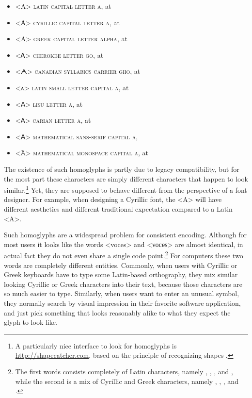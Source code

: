 \begin{itemize}
	\item[] <{A}> \textsc{latin capital letter a}, at  
	\item[] <{А}> \textsc{cyrillic capital letter a}, at  
	\item[] <{Α}> \textsc{greek capital letter alpha}, at  
	\item[] <{Ꭺ}> \textsc{cherokee letter go}, at  
	\item[] <{ᗅ}> \textsc{canadian syllabics carrier gho}, at  
	\item[] <{ᴀ}> \textsc{latin small letter capital a}, at  
	\item[] <{ꓮ}> \textsc{lisu letter a}, at  
	\item[] <{𐊠}> \textsc{carian letter a}, at  
	\item[] <{𝖠}> \textsc{mathematical sans-serif capital a},  
	\item[] <{𝙰}> \textsc{mathematical monospace capital a}, at  
\end{itemize}

The existence of such homoglyphs is partly due to legacy compatibility, but for
the most part these characters are simply different characters that happen to
look similar.\footnote{A particularly nice interface to look for homoglyphs is
\url{http://shapecatcher.com}, based on the principle of recognizing shapes
\citep{Belongie2002}.} Yet, they are supposed to behave different from the
perspective of a font designer. For example, when designing a Cyrillic font, the
<A> will have different aesthetics and different traditional expectation
compared to a Latin <A>.

Such homoglyphs are a widespread problem for consistent encoding. Although for
most users it looks like the words <voces> and <νοсеѕ> are almost identical, in
actual fact they do not even share a single code point.\footnote{The first words
consists completely of Latin characters, namely , ,
,  and , while the second is a mix of Cyrillic
and Greek characters, namely , , , 
and .} For computers these two words are completely different
entities. Commonly, when users with Cyrillic or Greek keyboards have to type
some Latin-based orthography, they mix similar looking Cyrillic or Greek
characters into their text, because those characters are so much easier to type.
Similarly, when users want to enter an unusual symbol, they normally search by
visual impression in their favorite software application, and just pick
something that looks reasonably alike to what they expect the glyph to look
like.

